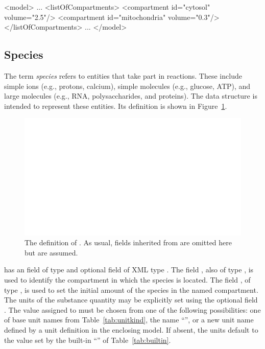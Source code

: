 \documentclass[10pt]{cekarticle}
\newcommand{\vref}[1]{\ref{#1}}
\begin{document}
\begin{example}
<model>
    ...
    <listOfCompartments>
        <compartment id="cytosol" volume="2.5"/>
        <compartment id="mitochondria" volume="0.3"/>
    </listOfCompartments>
    ...
</model>
\end{example}


\subsection{Species}
\label{sec:species}

The term \emph{species} refers to entities that take part in
reactions. These include simple ions (e.g., protons, calcium),
simple molecules (e.g., glucose, ATP), and large molecules (e.g.,
RNA, polysaccharides, and proteins).  The  data
structure is intended to represent these entities.  Its definition
is shown in Figure~\vref{fig:species}.

\begin{figure}[htb]
  \centering
  \includegraphics[scale = 0.68]{specie}
  \caption{The definition of .  As usual, fields inherited from
     are omitted here but are assumed.}
  \label{fig:species}
\end{figure}

 has an  field of type  and
optional  field of XML type . The field
, also of type , is used to
identify the compartment in which the species is located. The
field , of type , is used to
set the initial amount of the species in the named compartment.
The units of the substance quantity may be explicitly set using
the optional field . The value assigned to
 must be chosen from one of the following
possibilities: one of base unit names from
Table~\vref{tab:unitkind}, the name ``'', or a new
unit name defined by a unit definition in the enclosing model.  If
absent, the units default to the value set by the built-in
``'' of Table~\vref{tab:builtin}.
\end{document}

